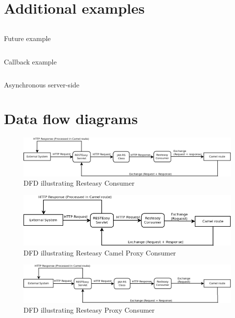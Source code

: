 \documentclass[12pt,final,oneside]{fithesis2}
\begin{document}
\newpage
\section{Additional examples}
\begin{listing}[ht]
	\inputminted[]{java}{sources/future.java}
	\caption{Future example}
	\label{future}
\end{listing}
\begin{listing}[H]
	\inputminted[]{java}{sources/callbackClient.java}
	\caption{Callback example}
	\label{callbackClient}
\end{listing}


\begin{listing}[ht]
	\inputminted[]{java}{sources/asyncServer.java}
	\caption{Asynchronous server-side}
	\label{async-server}
\end{listing}


\newpage
\clearpage
\section{Data flow diagrams}
\begin{figure}[H]
\advance\leftskip-2cm
\includegraphics[width=1.3\linewidth]{diagrams/basic.png}
\caption{DFD illustrating Resteasy Consumer}
\label{dfd-basic}
\end{figure}


\begin{figure}[H]
\advance\leftskip-0.5cm
\includegraphics[width=1.1\linewidth]{diagrams/camelProxy.png}
\caption{DFD illustrating Resteasy Camel Proxy Consumer}
\label{dfd-camel}
\end{figure}
 

\begin{figure}[h!]
\advance\leftskip-2cm
\includegraphics[width=1.3\linewidth]{diagrams/proxy.png}
\caption{DFD illustrating Resteasy Proxy Consumer}
\label{dfd-proxy}
\end{figure}
\end{document}
